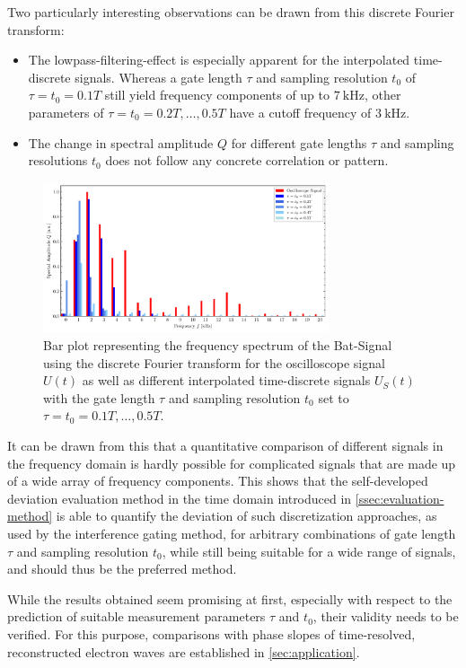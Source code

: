 Two particularly interesting observations can be drawn from this discrete Fourier transform:
\begin{itemize}
	\item The lowpass-filtering-effect is especially apparent for the interpolated time-discrete signals. Whereas a gate length $\tau$ and sampling resolution $t_0$ of $\tau = t_0 = 0.1T$ still yield frequency components of up to $\SI{7}{\kilo\hertz}$, other parameters of $\tau = t_0 = 0.2T, \dotsc ,0.5T$ have a cutoff frequency of $\SI{3}{\kilo\hertz}$.
	\item The change in spectral amplitude $Q$ for different gate lengths $\tau$ and sampling resolutions $t_0$ does not follow any concrete correlation or pattern.
\end{itemize}
\begin{figure}[H]
	\centering
	\includegraphics[width=0.75\textwidth]{Figures/Signals/batman_dft.pdf}
	\caption{Bar plot representing the frequency spectrum of the Bat-Signal using the discrete Fourier transform for the oscilloscope signal $U\left(t\right)$ as well as different interpolated time-discrete signals $U_S\left(t\right)$ with the gate length $\tau$ and sampling resolution $t_0$ set to $\tau = t_0 = 0.1T, \dotsc ,0.5T$.}
	\label{fig:batman-dft}
\end{figure}
It can be drawn from this that a quantitative comparison of different signals in the frequency domain is hardly possible for complicated signals that are made up of a wide array of frequency components. This shows that the self-developed deviation evaluation method in the time domain introduced in \cref{ssec:evaluation-method} is able to quantify the deviation of such discretization approaches, as used by the interference gating method, for arbitrary combinations of gate length $\tau$ and sampling resolution $t_0$, while still being suitable for a wide range of signals, and should thus be the preferred method.

While the results obtained seem promising at first, especially with respect to the prediction of suitable measurement parameters $\tau$ and $t_0$, their validity needs to be verified. For this purpose, comparisons with phase slopes of time-resolved, reconstructed electron waves are established in \cref{sec:application}. 